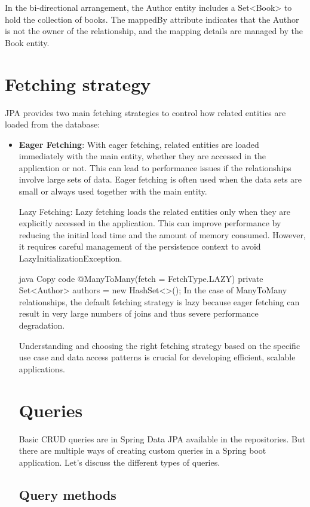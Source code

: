In the bi-directional arrangement, the Author entity includes a Set<Book> to hold the collection of books. The mappedBy attribute indicates that the Author is not the owner of the relationship, and the mapping details are managed by the Book entity.

\section{Fetching strategy}

JPA provides two main fetching strategies to control how related entities are loaded from the database:

\begin{itemize}
\item \textbf{Eager Fetching}: With eager fetching, related entities are loaded immediately with the main entity, whether they are accessed in the application or not. This can lead to performance issues if the relationships involve large sets of data. Eager fetching is often used when the data sets are small or always used together with the main entity.

Lazy Fetching: Lazy fetching loads the related entities only when they are explicitly accessed in the application. This can improve performance by reducing the initial load time and the amount of memory consumed. However, it requires careful management of the persistence context to avoid LazyInitializationException.

java
Copy code
@ManyToMany(fetch = FetchType.LAZY)
private Set<Author> authors = new HashSet<>();
In the case of ManyToMany relationships, the default fetching strategy is lazy because eager fetching can result in very large numbers of joins and thus severe performance degradation.

Understanding and choosing the right fetching strategy based on the specific use case and data access patterns is crucial for developing efficient, scalable applications.

\section{Queries}

Basic CRUD queries are in Spring Data JPA available in the repositories. But there are multiple ways of creating custom queries in a Spring boot application. Let's discuss the different
types of queries.

\subsection{Query methods}


\end{itemize}
